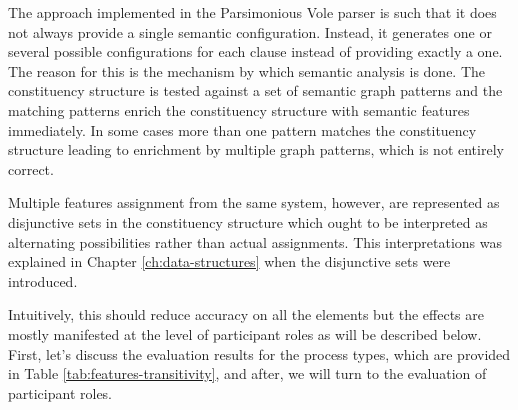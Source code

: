     The approach implemented in the Parsimonious Vole parser is such that it does not always provide a single semantic configuration. Instead, it generates one or several possible configurations for each clause instead of providing exactly a one. The reason for this is the mechanism by which semantic analysis is done. The constituency structure is tested against a set of semantic graph patterns and the matching patterns enrich the constituency structure with semantic features immediately. In some cases more than one pattern matches the constituency structure leading to enrichment by multiple graph patterns, which is not entirely correct. 
    
    Multiple features assignment from the same system, however, are represented as disjunctive sets in the constituency structure which ought to be interpreted as alternating possibilities rather than actual assignments. This interpretations was explained in Chapter \ref{ch:data-structures} when the disjunctive sets were introduced.
    
    Intuitively, this should reduce accuracy on all the elements but the effects are mostly manifested at the level of participant roles as will be described below. First, let's discuss the evaluation results for the process types, which are provided in Table \ref{tab:features-transitivity}, and after, we will turn to the evaluation of participant roles.
    
